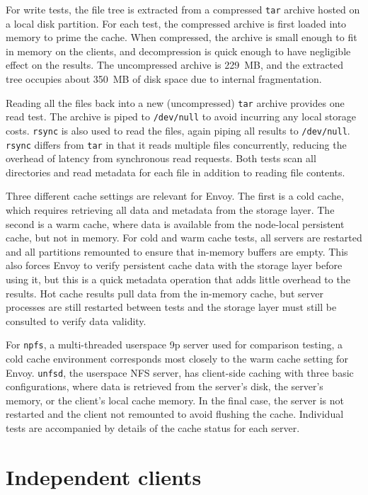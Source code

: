 For write tests, the file tree is extracted from a compressed \texttt{tar} archive hosted on a local disk partition. For each test, the compressed archive is first loaded into memory to prime the cache. When compressed, the archive is small enough to fit in memory on the clients, and decompression is quick enough to have negligible effect on the results. The uncompressed archive is 229~MB, and the extracted tree occupies about 350~MB of disk space due to internal fragmentation.

Reading all the files back into a new (uncompressed) \texttt{tar} archive provides one read test. The archive is piped to \texttt{/dev/null} to avoid incurring any local storage costs. \texttt{rsync} is also used to read the files, again piping all results to \texttt{/dev/null}. \texttt{rsync} differs from \texttt{tar} in that it reads multiple files concurrently, reducing the overhead of latency from synchronous read requests. Both tests scan all directories and read metadata for each file in addition to reading file contents.

Three different cache settings are relevant for Envoy. The first is a cold cache, which requires retrieving all data and metadata from the storage layer. The second is a warm cache, where data is available from the node-local persistent cache, but not in memory. For cold and warm cache tests, all servers are restarted and all partitions remounted to ensure that in-memory buffers are empty. This also forces Envoy to verify persistent cache data with the storage layer before using it, but this is a quick metadata operation that adds little overhead to the results. Hot cache results pull data from the in-memory cache, but server processes are still restarted between tests and the storage layer must still be consulted to verify data validity.

For \texttt{npfs}, a multi-threaded userspace 9p server used for comparison testing, a cold cache environment corresponds most closely to the warm cache setting for Envoy. \texttt{unfsd}, the userspace NFS server, has client-side caching with three basic configurations, where data is retrieved from the server's disk, the server's memory, or the client's local cache memory. In the final case, the server is not restarted and the client not remounted to avoid flushing the cache. Individual tests are accompanied by details of the cache status for each server.

\section{Independent clients}\label{sec:independent-clients}

